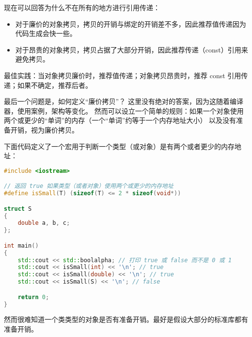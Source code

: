 \documentclass[../../LearnCpp.tex]{subfiles}
\begin{document}
现在可以回答为什么不在所有的地方进行引用传递：

\begin{itemize}
    \item 对于廉价的对象拷贝，拷贝的开销与绑定的开销差不多，因此推荐值传递因为代码生成会快一些。
    \item 对于昂贵的对象拷贝，拷贝占据了大部分开销，因此推荐传递（const）引用来避免拷贝。
\end{itemize}

最佳实践：当对象拷贝廉价时，推荐值传递；对象拷贝昂贵时，推荐 const 引用传递；如果不确定，推荐后者。

最后一个问题是，如何定义“廉价拷贝”？
这里没有绝对的答案，因为这随着编译器，使用案例，架构等变化。
然而可以设立一个简单的规则：如果一个对象使用两个或更少的“单词”的内存（一个“单词”约等于一个内存地址大小）
以及没有准备开销，视为廉价拷贝。

下面代码定义了一个宏用于判断一个类型（或对象）是有两个或者更少的内存地址：

\begin{lstlisting}[language=C++]
#include <iostream>

// 返回 true 如果类型（或者对象）使用两个或更少的内存地址
#define isSmall(T) (sizeof(T) <= 2 * sizeof(void*))

struct S
{
    double a, b, c;
};

int main()
{
    std::cout << std::boolalpha; // 打印 true 或 false 而不是 0 或 1
    std::cout << isSmall(int) << '\n'; // true
    std::cout << isSmall(double) << '\n'; // true
    std::cout << isSmall(S) << '\n'; // false

    return 0;
}
\end{lstlisting}

然而很难知道一个类类型的对象是否有准备开销。最好是假设大部分的标准库都有准备开销。
\end{document}
